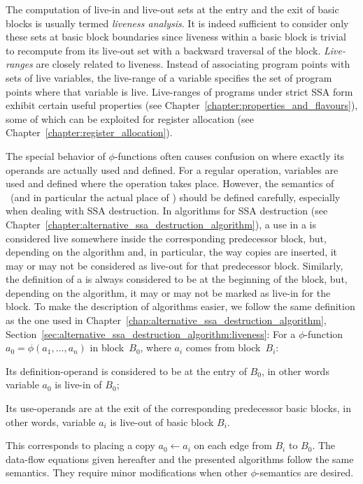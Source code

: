 The computation of live-in and live-out sets at the entry and the exit of basic blocks is usually termed \emph{liveness analysis}.
It is indeed sufficient to consider only these sets at basic block boundaries since liveness within a basic block is trivial to recompute from its live-out set with a backward traversal of the block.
\emph{Live-ranges} are closely related to liveness.
Instead of associating program points with sets of live variables, the live-range of a variable specifies the set of program points where that variable is live.
Live-ranges of programs under strict SSA form exhibit certain useful properties (see Chapter~\ref{chapter:properties_and_flavours}), some of which can be exploited for register allocation (see Chapter~\ref{chapter:register_allocation}).

The special behavior of $\phi$-functions often causes confusion on where exactly its operands are actually used and defined.
For a regular operation, variables are used and defined where the operation takes place.
However, the semantics of \phifuns\ (and in particular the actual place of \phiuses) should be defined carefully, especially when dealing with SSA destruction.
In algorithms for SSA destruction (see Chapter~\ref{chapter:alternative_ssa_destruction_algorithm}), a use in a \phifun is considered live somewhere inside the corresponding predecessor block, but, depending on the algorithm and, in particular, the way copies are inserted, it may or may not be considered as live-out for that predecessor block.
Similarly, the definition of a \phifun is always considered to be at the beginning of the block, but, depending on the algorithm, it may or may not be marked as live-in for the block.
To make the description of algorithms easier, we follow the same definition as the one used in Chapter~\ref{chap:alternative_ssa_destruction_algorithm}, Section~\ref{sec:alternative_ssa_destruction_algorithm:liveness}:
For a $\phi$-function $a_0 = \phi(a_1, \ldots, a_n)$ in block~$B_0$, where $a_i$ comes from block~$B_i$:
\begin{compactitem}
\item
	Its definition-operand is considered to be at the entry of $B_0$, in other words variable $a_0$ is live-in of $B_0$;
\item
	Its use-operands are at the exit of the corresponding predecessor basic blocks, in other words, variable $a_i$ is live-out of basic block $B_i$.
\end{compactitem}
This corresponds to placing a copy $a_0\gets a_i$ on each edge from $B_i$ to $B_0$.
The data-flow equations given hereafter and the presented algorithms follow the same semantics.
They require minor modifications when other $\phi$-semantics are desired.


